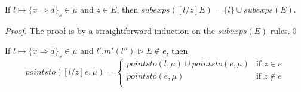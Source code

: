 \documentclass{llncs}
\begin{document}
\begin{mdframed}
\begin{lemma}
\label{l:sub-in-ses}
If $l \mapsto \{ x \Rightarrow \overline{d} \}_s \in \mu$ and $z \in E$, then $subexps([l / z]E) = \{ l \} \cup subexps(E)$.
\end{lemma}
\end{mdframed}

\begin{proof}
The proof is by a straightforward induction on the $subexps(E)$ rules.\qed
\end{proof}


\begin{mdframed}
\begin{lemma}
\label{l:sub-in-pt}
If $l \mapsto \{ x \Rightarrow \overline{d} \}_s \in \mu$ and $l'.m'(l'') \rhd E \not\in e$, then
\[
pointsto([l / z]e, \mu) =
\begin{cases}
    pointsto(l, \mu) \cup pointsto(e, \mu) & \text{if } z \in e\\
    pointsto(e, \mu) & \text{if } z \not\in e\\
\end{cases}
\]
\end{lemma}
\end{mdframed}
\end{document}
